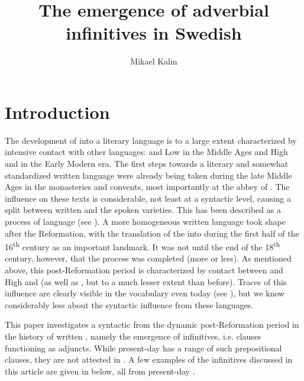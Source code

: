 \documentclass[output=paper]{langscibook}
\author{Mikael Kalm\affiliation{Stockholm University}}
\title{The emergence of adverbial infinitives in Swedish}
\begin{document}
\maketitle 



\section{Introduction}\label{sec:kalm:1}\largerpage
The development of  into a literary language is to a large extent characterized by intensive contact with other languages:  and Low  in the Middle Ages and High  and  in the Early Modern era. The first steps towards a literary and somewhat standardized written language were already being taken during the late Middle Ages in the monasteries and convents, most importantly at the abbey of . The  influence on these texts is considerable, not least at a syntactic level, causing a split between written  and the spoken varieties. This has been described as a process of language  (see \citealt{Hoder2009, Hoder2010}). A more homogeneous written language took shape after the Reformation, with the translation of the  into  during the first half of the 16\textsuperscript{th} century as an important landmark. It was not until the end of the 18\textsuperscript{th} century, however, that the  process was completed (more or less). As mentioned above, this post-Reformation period is characterized by contact between  and High  and  (as well as , but to a much lesser extent than before). Traces of this influence are clearly visible in the vocabulary even today (see \citealt{Teleman2003Swedish,Teleman2003Tradis}), but we know considerably less about the syntactic influence from these languages. 



This paper investigates a syntactic  from the dynamic post-Ref\-or\-ma\-tion period in the history of written , namely the emergence of  infinitives, i.e.  clauses functioning as  adjuncts. While present-day  has a range of such prepositional clauses, they are not attested in . A few examples of the  infinitives discussed in this article are given in  below, all from present-day .\largerpage  
\end{document}
